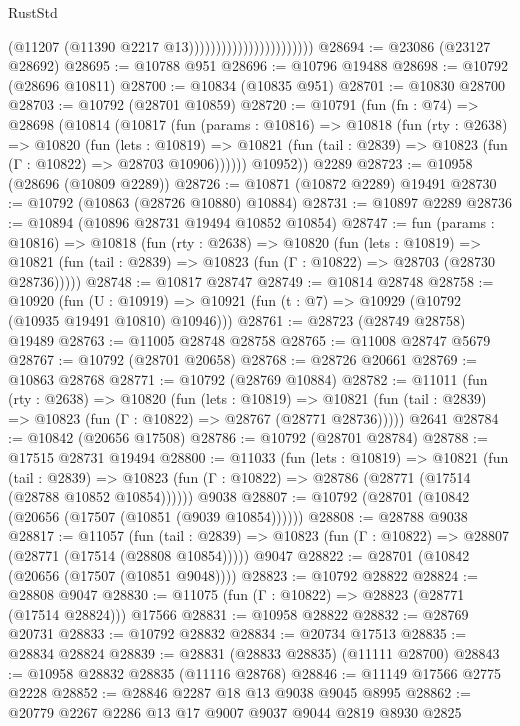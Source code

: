 \begin{lexlean}{RustStd}
\begin{coremodule}
                                              (@11207 (@11390 @2217 @13)))))))))))))))))))))))
@28694 := @23086 (@23127 @28692)
@28695 := @10788 @951
@28696 := @10796 @19488
@28698 := @10792 (@28696 @10811)
@28700 := @10834 (@10835 @951)
@28701 := @10830 @28700
@28703 := @10792 (@28701 @10859)
@28720 := @10791
    (fun (fn : @74) =>
    @28698
      (@10814
        (@10817
          (fun (params : @10816) =>
          @10818
            (fun (rty : @2638) =>
            @10820
              (fun (lets : @10819) =>
              @10821 (fun (tail : @2839) => @10823 (fun (Γ : @10822) => @28703 @10906))))))
        @10952))
    @2289
@28723 := @10958 (@28696 (@10809 @2289))
@28726 := @10871 (@10872 @2289) @19491
@28730 := @10792 (@10863 (@28726 @10880) @10884)
@28731 := @10897 @2289
@28736 := @10894 (@10896 @28731 @19494 @10852 @10854)
@28747 := fun (params : @10816) =>
  @10818
    (fun (rty : @2638) =>
    @10820
      (fun (lets : @10819) =>
      @10821 (fun (tail : @2839) => @10823 (fun (Γ : @10822) => @28703 (@28730 @28736)))))
@28748 := @10817 @28747
@28749 := @10814 @28748
@28758 := @10920
    (fun (U : @10919) => @10921 (fun (t : @7) => @10929 (@10792 (@10935 @19491 @10810) @10946)))
@28761 := @28723 (@28749 @28758) @19489
@28763 := @11005 @28748 @28758
@28765 := @11008 @28747 @5679
@28767 := @10792 (@28701 @20658)
@28768 := @28726 @20661
@28769 := @10863 @28768
@28771 := @10792 (@28769 @10884)
@28782 := @11011
    (fun (rty : @2638) =>
    @10820
      (fun (lets : @10819) =>
      @10821 (fun (tail : @2839) => @10823 (fun (Γ : @10822) => @28767 (@28771 @28736)))))
    @2641
@28784 := @10842 (@20656 @17508)
@28786 := @10792 (@28701 @28784)
@28788 := @17515 @28731 @19494
@28800 := @11033
    (fun (lets : @10819) =>
    @10821
      (fun (tail : @2839) =>
      @10823 (fun (Γ : @10822) => @28786 (@28771 (@17514 (@28788 @10852 @10854))))))
    @9038
@28807 := @10792 (@28701 (@10842 (@20656 (@17507 (@10851 (@9039 @10854))))))
@28808 := @28788 @9038
@28817 := @11057
    (fun (tail : @2839) => @10823 (fun (Γ : @10822) => @28807 (@28771 (@17514 (@28808 @10854)))))
    @9047
@28822 := @28701 (@10842 (@20656 (@17507 (@10851 @9048))))
@28823 := @10792 @28822
@28824 := @28808 @9047
@28830 := @11075 (fun (Γ : @10822) => @28823 (@28771 (@17514 @28824))) @17566
@28831 := @10958 @28822
@28832 := @28769 @20731
@28833 := @10792 @28832
@28834 := @20734 @17513
@28835 := @28834 @28824
@28839 := @28831 (@28833 @28835) (@11111 @28700)
@28843 := @10958 @28832 @28835 (@11116 @28768)
@28846 := @11149 @17566 @2775 @2228
@28852 := @28846 @2287 @18 @13 @9038 @9045 @8995
@28862 := @20779 @2267 @2286 @13 @17 @9007 @9037 @9044 @2819 @8930 @2825

\end{coremodule}
\end{lexlean}

